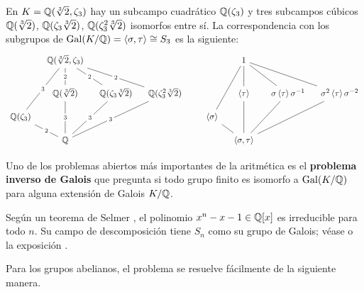 \begin{ejemplo}
  En $K = \mathbb{Q} (\sqrt[3]{2}, \zeta_3)$ hay un subcampo cuadrático $\mathbb{Q} (\zeta_3)$
  y tres subcampos cúbicos $\mathbb{Q}(\sqrt[3]{2})$, $\mathbb{Q}(\zeta_3\sqrt[3]{2})$,
  $\mathbb{Q}(\zeta_3^2\sqrt[3]{2})$ isomorfos entre sí. La correspondencia con los
  subgrupos de $\operatorname{Gal} (K/\mathbb{Q}) = \langle\sigma,\tau\rangle \cong S_3$ es la
  siguiente:
  \[ \begin{tikzcd}[row sep=1em,column sep=1em]
    & \QQ (\sqrt[3]{2}, \zeta_3)\ar[-]{dd}[description]{2}\ar[-]{ddr}[description]{2}\ar[-]{ddrr}[description]{2}\ar[-]{dddl}[description]{3} & & & & & 1\ar[-]{dd}\ar[-]{ddr}\ar[-]{ddrr}\ar[-]{dddl} \\
    \\
    & \QQ (\sqrt[3]{2})\ar[-]{dd}[description]{3} & \QQ (\zeta_3\sqrt[3]{2})\ar[-]{ddl}[description]{3} & \QQ (\zeta_3^2\sqrt[3]{2})\ar[-]{ddll}[description]{3} & & & \langle\tau\rangle\ar[-]{dd} & \,\sigma\,\langle\tau\rangle\,\sigma^{-1}\ar[-]{ddl} & \sigma^2\,\langle\tau\rangle\,\sigma^{-2}\ar[-]{ddll} \\
    \QQ (\zeta_3)\ar[-]{dr}[description]{2} & & & & & \langle\sigma\rangle\ar[-]{dr} \\
    & \QQ & & & & & \langle\sigma,\tau\rangle
  \end{tikzcd} \]
\end{ejemplo}

Uno de los problemas abiertos más importantes de la aritmética es el
\textbf{problema inverso de Galois} que pregunta si todo grupo finito es
isomorfo a $\operatorname{Gal} (K/\mathbb{Q})$ para alguna extensión de Galois $K/\mathbb{Q}$.

\begin{ejemplo}
  Según un teorema de Selmer \cite{Selmer-1956}, el polinomio
  $x^n - x - 1 \in \mathbb{Q} [x]$ es irreducible para todo $n$. Su campo de
  descomposición tiene $S_n$ como su grupo de Galois; véase \cite{Osada-1987}
  o la exposición \cite{KConrad-Selmer}.
\end{ejemplo}

Para los grupos abelianos, el problema se resuelve fácilmente de la siguiente
manera.

